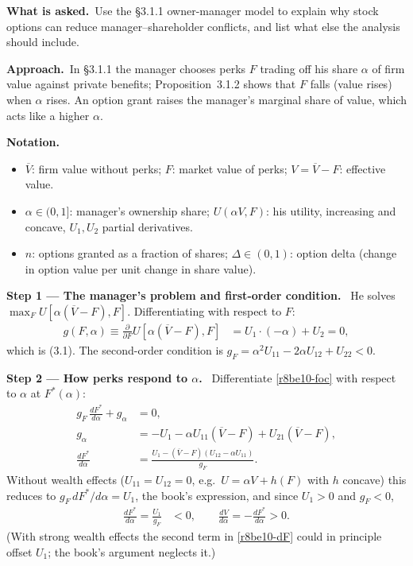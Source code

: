 \documentclass[11pt,a4paper]{article}
\newcommand{\notation}{\par\noindent\textbf{Notation.}}
\newcommand{\step}[2]{\par\medskip\noindent\textbf{Step #1 --- #2.}~}
\newcommand{\asked}{\par\medskip\noindent\textbf{What is asked.}~}
\newcommand{\approach}{\par\smallskip\noindent\textbf{Approach.}~}
\begin{document}
\asked Use the \S3.1.1 owner-manager model to explain why stock options can reduce manager--shareholder conflicts, and list what else the analysis should include.

\approach In \S3.1.1 the manager chooses perks $F$ trading off his share $\alpha$ of firm value against private benefits; Proposition~3.1.2 shows that $F$ falls (value rises) when $\alpha$ rises. An option grant raises the manager's marginal share of value, which acts like a higher $\alpha$.

\notation
\begin{itemize}
  \item $\overline V$: firm value without perks; $F$: market value of perks; $V=\overline V-F$: effective value.
  \item $\alpha\in(0,1]$: manager's ownership share; $U(\alpha V, F)$: his utility, increasing and concave, $U_1,U_2$ partial derivatives.
  \item $n$: options granted as a fraction of shares; $\Delta\in(0,1)$: option delta (change in option value per unit change in share value).
\end{itemize}

\step{1}{The manager's problem and first-order condition} He solves $\max_F U[\alpha(\overline V-F),F]$. Differentiating with respect to $F$:
\begin{align}
  g(F,\alpha) \equiv \frac{\partial}{\partial F}U[\alpha(\overline V-F),F] &= U_1\cdot(-\alpha) + U_2 = 0, \label{r8be10-foc}
\end{align}
which is (3.1). The second-order condition is $g_F=\alpha^2U_{11}-2\alpha U_{12}+U_{22}<0$.

\step{2}{How perks respond to $\alpha$} Differentiate \eqref{r8be10-foc} with respect to $\alpha$ at $F^*(\alpha)$:
\begin{align}
  g_F\,\frac{dF^*}{d\alpha} + g_\alpha &= 0, \nonumber\\
  g_\alpha &= -U_1 - \alpha U_{11}(\overline V-F) + U_{21}(\overline V-F), \nonumber\\
  \frac{dF^*}{d\alpha} &= \frac{U_1 - (\overline V-F)(U_{12}-\alpha U_{11})}{g_F}. \label{r8be10-dF}
\end{align}
Without wealth effects ($U_{11}=U_{12}=0$, e.g.\ $U=\alpha V+h(F)$ with $h$ concave) this reduces to $g_F\,dF^*/d\alpha=U_1$, the book's expression, and since $U_1>0$ and $g_F<0$,
\begin{align}
  \frac{dF^*}{d\alpha} = \frac{U_1}{g_F} &< 0, \qquad \frac{dV}{d\alpha} = -\frac{dF^*}{d\alpha} > 0. \label{r8be10-sign}
\end{align}
(With strong wealth effects the second term in \eqref{r8be10-dF} could in principle offset $U_1$; the book's argument neglects it.)
\end{document}
